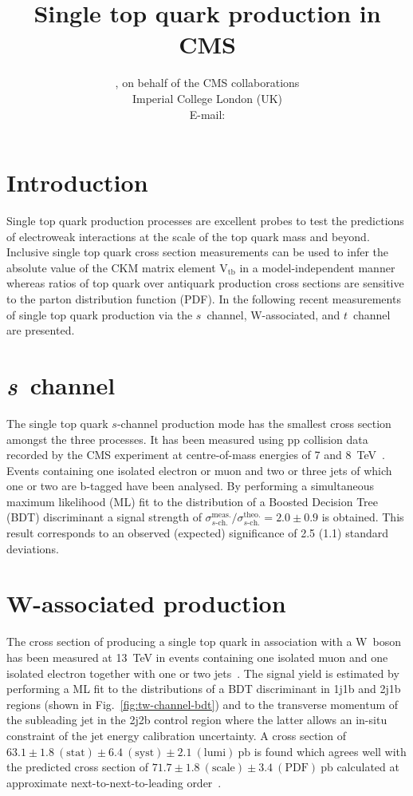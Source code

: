 \documentclass{PoS}
\title{Single top quark production in CMS}
\author{
    \speaker{Matthias Komm}, on behalf of the CMS collaborations\\
    Imperial College London (UK)\\
    E-mail: \email{Matthias.Komm@cern.ch}
}
\begin{document}
\section{Introduction}
Single top quark production processes are excellent probes to test the predictions of electroweak interactions at the scale of the top quark mass and beyond. Inclusive single top quark cross section measurements can be used to infer the absolute value of the CKM matrix element $\mathrm{V}_\mathrm{tb}$ in a model-independent manner whereas  ratios of top quark over antiquark production cross sections are sensitive to the parton distribution function (PDF). In the following recent measurements of single top quark production via the $s$~channel, W-associated, and $t$~channel are presented.

\section{\textit{s}~channel}

The single top quark $s$-channel production mode has the smallest cross section amongst the three processes. It has been measured using pp collision data recorded by the CMS experiment at centre-of-mass energies of 7 and 8~TeV~\cite{sch}. Events containing one isolated electron or muon and two or three jets of which one or two are b-tagged have been analysed. By performing a simultaneous maximum likelihood (ML) fit to the distribution of a Boosted Decision Tree (BDT) discriminant a signal strength of $\sigma^\mathrm{meas.}_{s\mbox{-}\mathrm{ch.}}/\sigma^\mathrm{theo.}_{s\mbox{-}\mathrm{ch.}}=2.0\pm0.9$ is obtained. This result corresponds to an observed (expected) significance of 2.5 (1.1) standard deviations.


\section{W-associated production}

The cross section of producing a single top quark in association with a W~boson has been measured at 13~TeV in events containing one isolated muon and one isolated electron together with one or two jets~\cite{tWch}. The signal yield is estimated by performing a ML fit to the distributions of a BDT discriminant in 1j1b and 2j1b regions (shown in Fig.~\ref{fig:tw-channel-bdt}) and to the transverse momentum of the subleading jet in the 2j2b control region where the latter allows an in-situ constraint of the jet energy calibration uncertainty. A cross section of $63.1\pm1.8~\mathrm{(stat)}\pm6.4~\mathrm{(syst)}\pm2.1~\mathrm{(lumi)}~\mathrm{pb}$ is found which agrees well with the predicted cross section of $71.7\pm1.8~\mathrm{(scale)}\pm3.4~\mathrm{(PDF)}~\mathrm{pb}$ calculated at approximate next-to-next-to-leading order~\cite{tw-xsec}.
\end{document}
